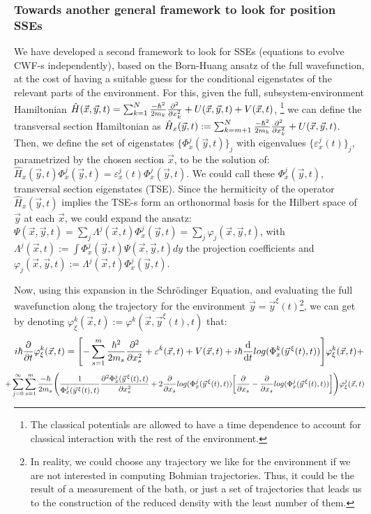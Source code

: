 \documentclass[11pt, a4paper]{article} %
\begin{document}
\subsubsection*{Towards another general framework to look for position SSEs}
We have developed a second framework to look for SSEs (equations to evolve CWF-s independently), based on the Born-Huang ansatz of the full wavefunction, at the cost of having a suitable guess for the conditional eigenstates of the relevant parts of the environment. For this, given the full, subsystem-environment Hamiltonian $\hat{H}(\vec{x},\vec{y},t)=\sum_{k=1}^N \frac{-\hbar^2}{2m_k}\pdv[2]{}{x_k} + U(\vec{x},\vec{y},t)+V(\vec{x},t)$, \footnote{The classical potentials are allowed to have a time dependence to account for classical interaction with the rest of the environment.} we can define the transversal section Hamiltonian as $\hat{H}_x(\vec{y},t):=\sum_{k=m+1}^N\frac{-\hbar^2}{2m_k}\pdv[2]{}{x_k}+U(\vec{x},\vec{y},t)$. Then, we define the set of eigenstates $\{\Phi^j_x(\vec{y},t)\}_j$ with eigenvalues $\{\varepsilon_x^j(t)\}_j$, parametrized by the chosen section $\vec{x}$, to be the solution of: $\hat{H}_x(\vec{y},t)\Phi^j_x(\vec{y},t)=\varepsilon_x^j(t)\Phi^j_x(\vec{y},t)$. We could call these $\Phi^j_x(\vec{y},t)$, transversal section eigenstates (TSE). Since the hermiticity of the operator $\hat{H}_x(\vec{y},t)$ implies the TSE-s form an orthonormal basis for the Hilbert space of $\vec{y}$ at each $\vec{x}$, we could expand the ansatz: $\Psi(\vec{x},\vec{y},t)=\sum_j \Lambda^j(\vec{x},t)\Phi_x^j(\vec{y},t)=\sum_j \varphi_j(\vec{x},\vec{y},t)$, with $\Lambda^j(\vec{x},t):=\int\Phi^j_x(\vec{y},t)\Psi(\vec{x},\vec{y},t)dy$ the projection coefficients and $\varphi_j(\vec{x},\vec{y},t):=\Lambda^j(\vec{x},t)\Phi^j_x(\vec{y},t)$.

Now, using this expansion in the Schrödinger Equation, and evaluating the full wavefunction along the trajectory for the environment $\vec{y}=\vec{y}^\xi(t)$\footnote{In reality, we could choose any trajectory we like for the environment if we are not interested in computing Bohmian trajectories. Thus, it could be the result of a measurement of the bath, or just a set of trajectories that leads us to the construction of the reduced density with the least number of them.}, we can get by denoting $\varphi^k_\xi(\vec{x},t):=\varphi^k(\vec{x},\vec{y}^\xi(t),t)$ that:
\begin{equation}
 i\hbar\pdv{}{t}\varphi^k_\xi(\vec{x},t)=\qty[-\sum_{s=1}^m\frac{\hbar^2}{2m_s}\pdv[2]{}{x_s}+ \varepsilon^k(\vec{x},t)+V(\vec{x},t)   +i\hbar \dv{}{t}log(\Phi^k_x(\vec{y}^{\, \xi}(t),t))]\varphi^k_\xi(\vec{x},t)+
\end{equation}
$$
\hspace{-0.4cm}+\sum_{j=0}^\infty\sum_{s=1}^m \frac{-\hbar}{2m_s}\qty( \frac{1}{\Phi^j_x(\vec{y}^{\, \xi}(t),t)}\pdv[2]{\Phi^j_x(\vec{y}^{\, \xi}(t),t)}{x_s}+2\pdv{}{x_s}log(\Phi^j_x(\vec{y}^{\, \xi}(t),t))\qty[\pdv{}{x_s}-\pdv{}{x_s}log(\Phi^j_x(\vec{y}^{\, \xi}(t),t))] )\varphi^j_\xi(\vec{x},t)
$$
\end{document}
